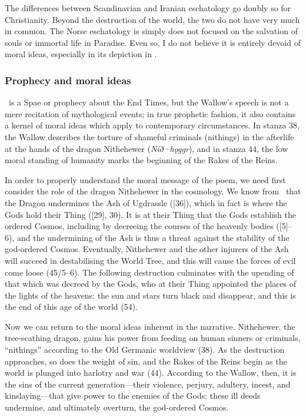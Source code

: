 The differences between Scandinavian and Iranian eschatology go doubly so for Christianity.  Beyond the destruction of the world, the two do not have very much in common.  The Norse eschatology is simply does not focused on the salvation of souls or immortal life in Paradise.  Even so, I do not believe it is entirely devoid of moral ideas, especially in its depiction in \Voluspa.

\subsubsection{Prophecy and moral ideas}

\Voluspa\ is a Spae or prophecy about the End Times, but the Wallow’s speech is not a mere recitation of mythological events; in true prophetic fashion, it also contains a kernel of moral ideas which apply to contemporary circumstances.  In stanza 38, the Wallow describes the torture of shameful criminals (nithings) in the afterlife at the hands of the dragon Nithehewer (\emph{Níð·hǫggr}), and in stanza 44, the low moral standing of humanity marks the beginning of the Rakes of the Reins.

In order to properly understand the moral message of the poem, we need first consider the role of the dragon Nithehewer in the cosmology.
We know from \Grimnismal\ that the Dragon undermines the Ash of Ugdrassle ([36]), which in fact is where the Gods hold their Thing ([29], 30).  It is at their Thing that the Gods establish the ordered Cosmos, including by decreeing the courses of the heavenly bodies ([5]--6), and the undermining of the Ash is thus a threat against the stability of the god-ordered Cosmos.
Eventually, Nithehewer and the other injurers of the Ash will succeed in destabilising the World Tree, and this will cause the forces of evil come loose (45/5--6).  The following destruction culminates with the upending of that which was decreed by the Gods, who at their Thing appointed the places of the lights of the heavens: the sun and stars turn black and disappear, and this is the end of this age of the world (54).

Now we can return to the moral ideas inherent in the narrative.  Nithehewer, the tree-scathing dragon, gains his power from feeding on human sinners or criminals, “nithings” according to the Old Germanic worldview (38).   As the destruction approaches, so does the weight of sin, and the Rakes of the Reins begin as the world is plunged into harlotry and war (44).  According to the Wallow, then, it is the sins of the current generation---their violence, perjury, adultery, incest, and kinslaying---that give power to the enemies of the Gods; these ill deeds undermine, and ultimately overturn, the god-ordered Cosmos.

